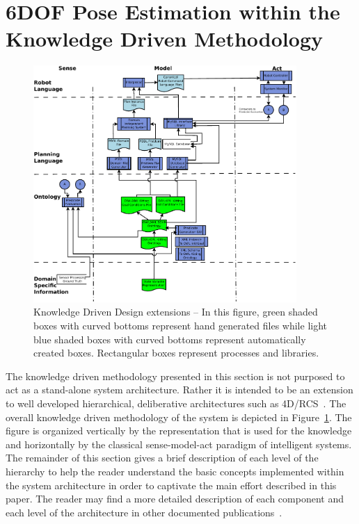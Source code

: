 \section{6DOF Pose Estimation within the Knowledge Driven Methodology}
\label{sect:architecture}
\begin{figure}[!t!h!b!]
\centering
\includegraphics[width=10cm]{images/KnowledgeDrivenRobotics.pdf}
\caption{Knowledge Driven Design extensions -- In this figure, green shaded
  boxes with curved bottoms represent hand generated files while light blue
  shaded boxes with curved bottoms represent automatically created boxes.
  Rectangular boxes represent processes and libraries. }
\label{fig:methodology}
\end{figure}

The knowledge driven methodology presented in this section is not purposed
to act as a stand-alone system architecture. Rather it is intended to be an
extension to well developed hierarchical, deliberative architectures such
as 4D/RCS~\cite{Albus2000}. The overall knowledge driven methodology of the
system is depicted in Figure~\ref{fig:methodology}. The figure is organized
vertically by the representation that is used for the knowledge and
horizontally by the classical sense-model-act paradigm of intelligent
systems. The remainder of this section gives a brief description of each
level of the hierarchy to help the reader understand the basic concepts
implemented within the system architecture in order to captivate the main effort described in this paper. The reader may find a more
detailed description of each component and each level of the architecture
in other documented
publications~\cite{BALAKIRSKY.IROS.2012}.

